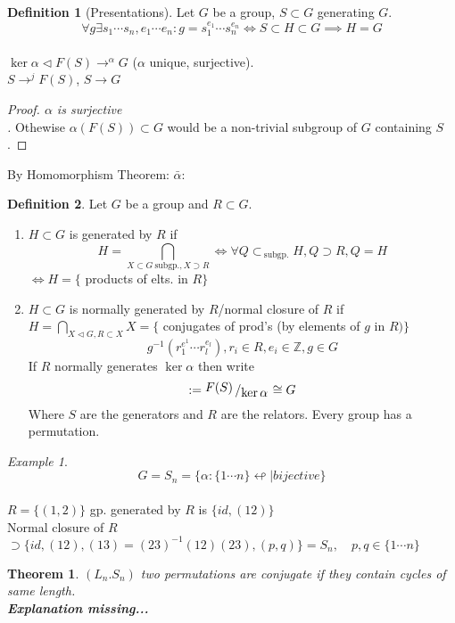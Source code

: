 \documentclass{article}
\let\ddd\cdots
\newcommand{\Z}{\mathbb{Z}}
\newcommand{\quotient}[2]{{\raisebox{.2em}{$#1$}\left/\raisebox{-.2em}{$#2$}\right.}}
\newcommand{\subgp}{\ \mathrm{subgp.}}
\newtheorem{theorem}{Theorem}[section]
\theoremstyle{definition}
\newtheorem{definition}{Definition}[section]
\theoremstyle{remark}
\theoremstyle{example}
\newtheorem*{example}{Example}
\begin{document}
		\begin{definition}[Presentations]
			Let $G$ be a group, $S \subset G$ generating $G$.\[ \forall g \exists s_1\ddd s_n,e_1 \ddd e_n : g = s_1^{e_1} \ddd s_n^{e_n} \iff S \subset H \subset G \implies H = G\]\\
			$\ker \alpha \triangleleft F(S) \to^\alpha G$ ($\alpha$ unique, surjective).\\
			$S \to ^ j F(S)$, $S \to G$
		\end{definition}
		\begin{proof}[Proof. $\alpha$ is surjective\\]
			Othewise $\alpha(F(S)) \subset G$ would be a non-trivial subgroup of $G$ containing $S$.
		\end{proof}
		By Homomorphism Theorem: $\bar{\alpha} : $ \\
		\begin{definition}
			Let $G$ be a group and $R \subset G$.\\
			\begin{enumerate}
				\item $H \subset G$ is generated by $R$ if \[H=\bigcap_{X \subset G\ \mathrm{subgp.}, X \supset R} \iff \forall Q \subset_{\subgp}  H, Q \supset R, Q=H \]
				$ \iff H = \{$ products of elts. in $R\}$
				\item $H \subset G$ is normally generated by $R$/normal closure of $R$ if 
				$ H=\bigcap_{X \triangleleft G, R \subset X} X = \{$ conjugates of prod's (by elements of $g$ in $R ) \}$
				\[ g^{-1}(r_1^{e^1} \ddd r_l^{e_l}), r_i \in R, e_i \in \Z, g \in G \]
				If $R$ normally generates $\ker \alpha$ then write \[<S|R>:=\quotient{F(S)}{\ker\alpha} \cong G \]
				Where $S$ are the generators and $R$ are the relators. Every group has a permutation.
			\end{enumerate}
			\begin{example}
				\[ G=S_n = \{ \alpha : \{1 \ddd n \}  \looparrowleft | bijective \} \]\\
				$R=\{(1,2)\}$ gp. generated by $R$ is $\{id, (12) \}$\\
				Normal closure of $R$ $\supset \{id,(12),(13)=(23)^{-1}(12)(23),(p,q) \}=S_n,\quad p,q  \in \{1 \ddd n\}$
			\end{example}
		\end{definition}
	
		\begin{theorem}
			$(L_n . S_n )$ two permutations are conjugate if they contain cycles of same length.\\
			\textbf{Explanation missing...}
		\end{theorem}
		
\end{document}
